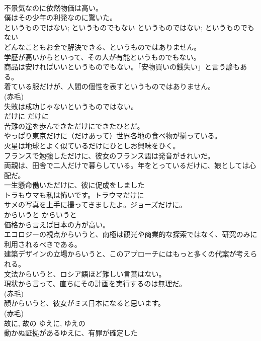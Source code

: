 \documentclass[8pt]{extreport}
\begin{document}
\begin{CJK}{UTF8}{min}
\\	不景気なのに依然物価は高い。   
\\	僕はその少年の利発なのに驚いた。   
\\	というものではない; というものでもない	というものではない; というものでもない	
\\	どんなこともお金で解決できる、というものではありません。  
\\	学歴が高いからといって、その人が有能というものでもない。  
\\	商品は安ければいいというものでもない。｢安物買いの銭失い」と言う諺もある。  
\\	着ている服だけが、人間の個性を表すというものではありません。  
\\	(赤毛)
\\	失敗は成功じゃないというものではない。   
\\	だけに	だけに	
\\	苦難の途を歩んできただけにできたひとだ。  
\\	やっぱり東京だけに（だけあって）世界各地の食べ物が揃っている。  
\\	火星は地球とよく似ているだけにひとしお興味をひく。  
\\	フランスで勉強しただけに、彼女のフランス語は発音がきれいだ。  
\\	両親は、田舎で二人だけで暮らしている。年をとっているだけに、娘としては心配だ。  
\\	一生懸命働いただけに、彼に促成をしました   
\\	トラもウマも私は怖いです。トラウマだけに  
\\	サメの写真を上手に撮ってきましたよ。ジョーズだけに。  
\\	からいうと	からいうと	
\\	価格から言えば日本の方が高い。  
\\	エコロジーの視点からいうと、南極は観光や商業的な探索ではなく、研究のみに利用されるべきである。  
\\	建築デザインの立場からいうと、このアプローチにはもっと多くの代案が考えられる。   
\\	文法からいうと、ロシア語ほど難しい言葉はない。  
\\	現状から言って、直ちにその計画を実行するのは無理だ。  
\\	(赤毛)
\\	顔からいうと、彼女がミス日本になると思います。  
\\	(赤毛)
\\	故に, 故の	ゆえに, ゆえの	
\\	動かぬ証拠があるゆえに、有罪が確定した  

\end{CJK}
\end{document}
